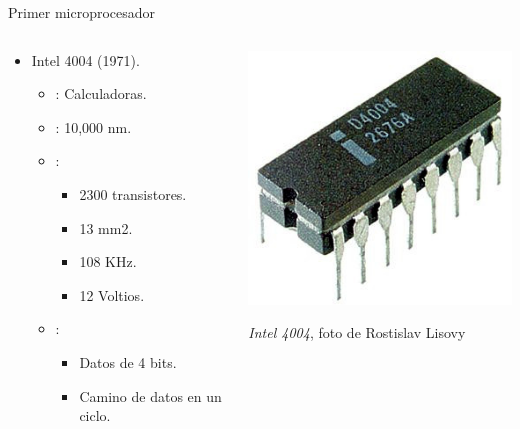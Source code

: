\begin{frame}[t]{Primer microprocesador}
\begin{columns}[T]
  \begin{column}{.7\textwidth}
    \begin{itemize}
      \item Intel 4004 (1971).
        \begin{itemize}
          \item {}: Calculadoras.
          \item {}: 10,000 nm.
          \item {}:
            \begin{itemize}
              \item 2300 transistores.
              \item 13 mm2.
              \item 108 KHz.
              \item 12 Voltios.
            \end{itemize}
          \item {}:
            \begin{itemize}
              \item Datos de 4 bits.
              \item Camino de datos en un ciclo.
            \end{itemize}
      \end{itemize}
    \end{itemize}
  \end{column}
  \begin{column}{.3\textwidth}
    \includegraphics[width=.5\textwidth]{images/intel-4004.jpg}\\
    \begin{tiny}
      \emph{Intel 4004}, foto de Rostislav Lisovy\\

\end{tiny}
\end{column}
\end{columns}
\end{frame}

